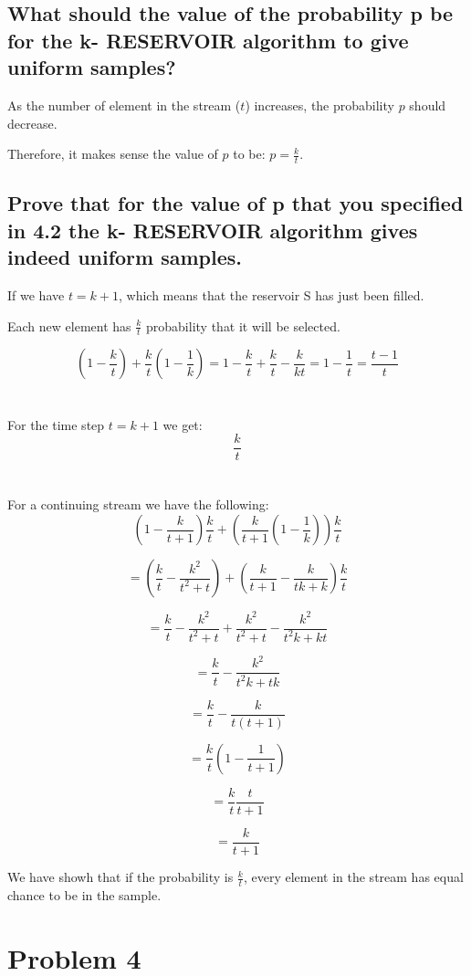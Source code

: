 \documentclass[11pt]{article}
\begin{document}
\subsection{What should the value of the probability p be for the k- RESERVOIR algorithm to give uniform samples?}

As the number of element in the stream ($t$) increases, the probability $p$ should decrease.

Therefore, it makes sense the value of $p$ to be: $p = \frac{k}{t}$.

\subsection{Prove that for the value of p that you specified in 4.2 the k- RESERVOIR algorithm gives indeed uniform samples.}
If we have $t = k + 1$, which means that the reservoir S has just been filled.

Each new element has $\frac{k}{t}$ probability that it will be selected.

$$ \left( 1-\frac{k}{t} \right)+\frac{k}{t} \left( 1-\frac{1}{k} \right) = 1-\frac{k}{t}+\frac{k}{t}-\frac{k}{kt} = 1-\frac{1}{t} = \frac{t-1}{t} $$
\\~\\
For the time step $t=k+1$ we get:
$$ \frac{k}{t} $$
\\~\\
For a continuing stream we have the following:
$$ \left(1-\frac{k}{t+1}\right)\frac{k}{t}+\left(\frac{k}{t+1}(1-\frac{1}{k})\right)\frac{k}{t} $$

$$ = \left(\frac{k}{t}-\frac{k^2}{t^2+t}\right) + \left(\frac{k}{t+1} - \frac{k}{tk+k}\right)\frac{k}{t} $$

$$ = \frac{k}{t}-\frac{k^2}{t^2+t} + \frac{k^2}{t^2+t} - \frac{k^2}{t^2k+kt} $$

$$ = \frac{k}{t} - \frac{k^2}{t^2k + tk} $$

$$ = \frac{k}{t} - \frac{k}{t(t+1)} $$

$$ = \frac{k}{t}\left(1-\frac{1}{t+1}\right) $$

$$ = \frac{k}{t} \frac{t}{t+1} $$

$$ = \frac{k}{t+1} $$

We have showh that if the probability is $\frac{k}{t}$, every element in the stream has equal chance to be in the sample.


\section{Problem 4}
\end{document}
